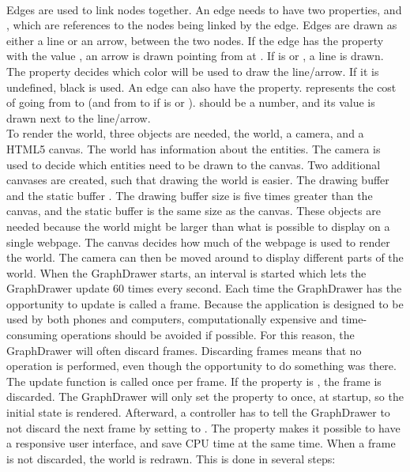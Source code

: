 \\[11pt]
Edges are used to link nodes together. An edge needs to have two properties,  and , which are references to the nodes being linked by the edge. Edges are drawn as either a line or an arrow, between the two nodes. If the edge has the property  with the value , an arrow is drawn pointing from  at . If  is  or , a line is drawn. The  property decides which color will be used to draw the line/arrow. If it is undefined, black is used. An edge can also have the  property.  represents the cost of going from  to  (and from  to  if  is  or ).  should be a number, and its value is drawn next to the line/arrow.
\\[11pt]
To render the world, three objects are needed, the world, a camera, and a HTML5 canvas. The world has information about the entities. The camera is used to decide which entities need to be drawn to the canvas. Two additional canvases are created, such that drawing the world is easier. The drawing buffer  and the static buffer . The drawing buffer size is five times greater than the canvas, and the static buffer is the same size as the canvas. These objects are needed because the world might be larger than what is possible to display on a single webpage. The canvas decides how much of the webpage is used to render the world. The camera can then be moved around to display different parts of the world. When the GraphDrawer starts, an interval is started which lets the GraphDrawer update 60 times every second. Each time the GraphDrawer has the opportunity to update is called a frame. Because the application is designed to be used by both phones and computers, computationally expensive and time-consuming operations should be avoided if possible. For this reason, the GraphDrawer will often discard frames. Discarding frames means that no operation is performed, even though the opportunity to do something was there. The update function is called once per frame. If the  property is , the frame is discarded. The GraphDrawer will only set the  property to  once, at startup, so the initial state is rendered. Afterward, a controller has to tell the GraphDrawer to not discard the next frame by setting  to . The  property makes it possible to have a responsive user interface, and save CPU time at the same time. When a frame is not discarded, the world is redrawn. This is done in several steps:
